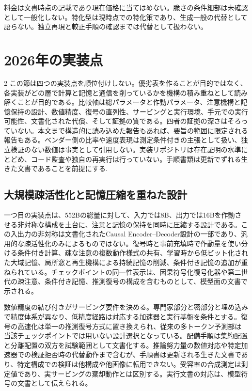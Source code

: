 \documentclass[lualatex,a4paper,10pt]{jlreq}
\begin{document}
\begin{claimboundary}[本節の読解上の境界]
料金は文書時点の記載であり現在価格に当てはめない。脆さの条件細部は未確認として一般化しない。特化型は現時点での特化策であり、生成一般の代替として語らない。独立再現と較正手順の確認までは代替として扱わない。
\end{claimboundary}

\section{2026年の実装点}
\label{sec:capstone}

\begin{multicols}{2}
\raggedcolumns
この節は四つの実装点を順位付けしない。優劣表を作ることが目的ではなく、各実装がどの層で計算と記憶と通信を削っているかを機構の積み重ねとして読み解くことが目的である。比較軸は総パラメータと作動パラメータ、注意機構と記憶保持の設計、数値精度、復号の直列性、サービングと実行環境、手元での実行可能性、文書化された代償、そして証拠の質である。四者の証拠の深さはそろっていない。本文まで構造的に読み込めた報告もあれば、要旨の範囲に限定される報告もある。ベンダー側の比率や速度表現は測定条件付きの主張として扱い、独立検証のない数値は事実として引用しない。実装リポジトリは存在証明の水準にとどめ、コード監査や独自の再実行は行っていない。手順書類は更新でずれる生きた文書であることを前提にする\autocite{v41report,qwen38next,glm5report}.

\subsection{大規模疎活性化と記憶圧縮を重ねた設計}
一つ目の実装点は、552Bの総量に対して、入力では8B、出力では16Bを作動させる非対称な構成を土台に、注意と記憶の保持を同時に圧縮する設計である\autocite{v41report}\autocite{v41card}。この入出力の非対称は文書化されたCausal Encoder--Decoder設計の一部であり、汎用的な疎活性化のみによるものではない。復号時と事前充填時で作動量を使い分ける条件付き計算、疎な注意の複数動作様式の共有、学習時から低ビット化された大域記憶、局所窓と再生機構による持続記憶の削減、条件付き記憶の追加が重ねられている。チェックポイントの同一性表示は、因果符号化復号化器や第二世代の疎注意、条件付き記憶、推測復号の構成を含むものとして、模型面の文書で示される\autocite{v41card}。

数値精度の結び付きがサービング要件を決める。専門家部分と密部分と埋め込みで精度体系が異なり、低精度経路は対応する加速器と実行基盤を条件とする。復号の高速化は単一の推測復号方式に置き換えられ、従来の多トークン予測部は当該チェックポイントでは用いない設計選択となっている。配備手順は集約配置と分離配置の双方を試験範囲として文書化する\autocite{dynamo}。推論努力量の数値対応や特定加速器での検証拒否時の代替動作まで含むが、手順書は更新される生きた文書であり、特定構成での検証は他構成や他画像に転用できない\autocite{vllmrecipe}。受容率の合成測定は測定値であり、実サービングの棄却動作とは区別する。実行文書の対応は、模型符号の文書として伝えられる\autocite{vllmv41}。


\end{multicols}
\end{document}
